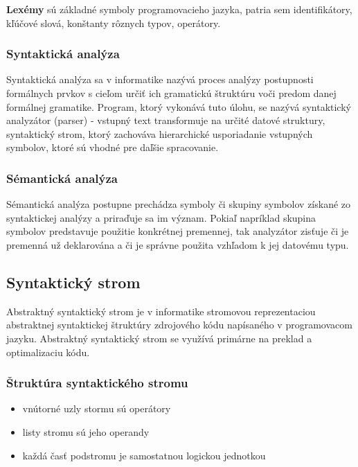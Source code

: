 \textbf{Lexémy} sú základné symboly programovacieho jazyka, patria sem identifikátory,
kľúčové slová, konštanty rôznych typov, operátory.

\subsubsection{Syntaktická analýza}
Syntaktická analýza sa v informatike nazývá proces analýzy postupnosti 
formálnych prvkov s cieľom určiť ich gramatickú štruktúru voči predom danej formálnej gramatike.
Program, ktorý vykonává tuto úlohu, se nazývá syntaktický analyzátor (parser) - 
vstupný text transformuje na určité datové struktury, syntaktický strom, 
ktorý zachováva hierarchické usporiadanie vstupných symbolov, ktoré sú vhodné pre daľšie spracovanie.

\subsubsection{Sémantická analýza}
Sémantická analýza postupne prechádza symboly či skupiny symbolov získané 
zo syntaktickej analýzy a priraďuje sa im význam. Pokiaľ napríklad skupina symbolov
predstavuje použitie konkrétnej premennej, tak analyzátor zisťuje či je premenná už 
deklarována a či je správne použita vzhľadom k jej datovému typu.

\subsection{Syntaktický strom}
Abstraktný syntaktický strom je v informatike stromovou reprezentaciou 
abstraktnej syntaktickej štruktúry zdrojového kódu 
napísaného v programovacom jazyku. 
Abstraktný syntaktický strom se využívá primárne na preklad a optimalizaciu kódu.

\subsubsection{Štruktúra syntaktického stromu}

\begin{itemize}
	\item vnútorné uzly stormu sú operátory

	\item listy stromu sú jeho operandy

	\item každá časť podstromu je samostatnou logickou jednotkou
\end{itemize}


